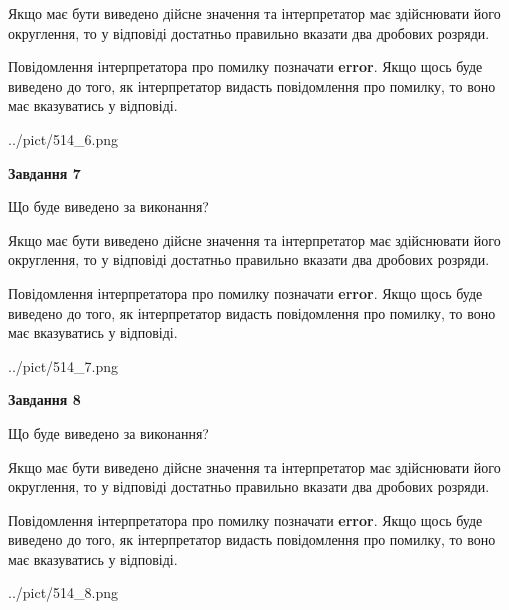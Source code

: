 \documentclass[12pt, ukrainian]{article}
\begin{document}
{\begin {Large}
Якщо має бути виведено дійсне значення та інтерпретатор має здійснювати його округлення, 
то у відповіді достатньо правильно вказати два дробових розряди.

Повідомлення інтерпретатора про помилку позначати \textbf{error}.
Якщо щось буде виведено до того, як інтерпретатор видасть повідомлення про помилку, 
то воно має вказуватись у відповіді. \par

\begin{center}
	{../pict/514_6.png}
\end{center}
\newpage

{\begin {center}\textbf{Завдання 7}\end {center}}\par
Що буде виведено за виконання? \par

Якщо має бути виведено дійсне значення та інтерпретатор має здійснювати його округлення, 
то у відповіді достатньо правильно вказати два дробових розряди.

Повідомлення інтерпретатора про помилку позначати \textbf{error}.
Якщо щось буде виведено до того, як інтерпретатор видасть повідомлення про помилку, 
то воно має вказуватись у відповіді. \par

\begin{center}
	{../pict/514_7.png}
\end{center}
\newpage

{\begin {center}\textbf{Завдання 8}\end {center}}\par
Що буде виведено за виконання? \par

Якщо має бути виведено дійсне значення та інтерпретатор має здійснювати його округлення, 
то у відповіді достатньо правильно вказати два дробових розряди.

Повідомлення інтерпретатора про помилку позначати \textbf{error}.
Якщо щось буде виведено до того, як інтерпретатор видасть повідомлення про помилку, 
то воно має вказуватись у відповіді. \par

\begin{center}
	{../pict/514_8.png}
\end{center}
\newpage


\end{Large}}
\end{document}
